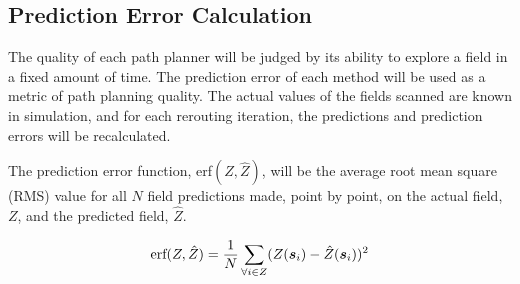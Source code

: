 \subsection{Prediction Error Calculation}
The quality of each path planner will be judged by its ability to explore a field in a fixed amount of time. The prediction error of each method will be used as a metric of path planning quality. The actual values of the fields scanned are known in simulation, and for each rerouting iteration, the predictions and prediction errors will be recalculated.

The prediction error function, erf$(Z,\hat{Z})$, will be the average root mean square (RMS) value for all $N$ field predictions made, point by point, on the actual field, $Z$, and the predicted field, $\hat{Z}$.

\begin{equation}
\text{erf}(Z, \hat{Z}) = \frac{1}{N}\sum_{\forall i \in Z} (Z({\it{\boldsymbol{s}}}_i) - \hat{Z}({\it{\boldsymbol{s}}}_i))^2
\end{equation}






